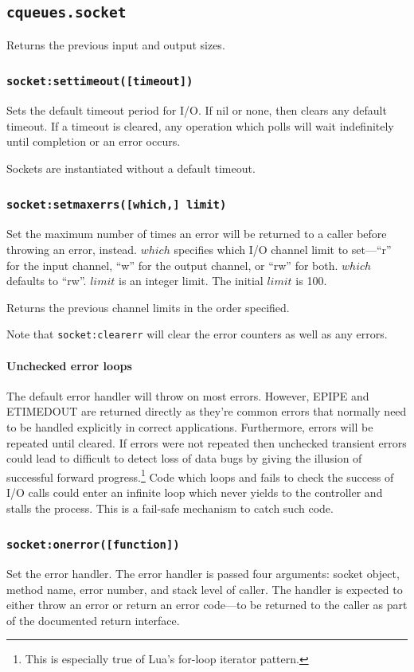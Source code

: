 \documentclass[11pt, oneside]{memoir}
\newcommand*{\fn}[1]{\texttt{#1}\xspace}
\newcounter{toccols}
\newenvironment{Module}[1]{
	\subsection{\texttt{#1}}
	\addtocontents{toc}{
		\protect\begin{multicols}{\value{toccols}}
	}
}{
	\addtocontents{toc}{\protect\end{multicols}}
}
\begin{document}
\begin{Module}{cqueues.socket}
Returns the previous input and output sizes.

\subsubsection[\fn{socket:settimeout}]{\fn{socket:settimeout([timeout])}}

Sets the default timeout period for I/O. If nil or none, then clears any default timeout. If a timeout is cleared, any operation which polls will wait indefinitely until completion or an error occurs.

Sockets are instantiated without a default timeout.

\subsubsection[\fn{socket:setmaxerrs}]{\fn{socket:setmaxerrs([which,] limit)}}

Set the maximum number of times an error will be returned to a caller before throwing an error, instead. $which$ specifies which I/O channel limit to set---``r'' for the input channel, ``w'' for the output channel, or ``rw'' for both. $which$ defaults to ``rw''. $limit$ is an integer limit. The initial $limit$ is 100.

Returns the previous channel limits in the order specified.

Note that \fn{socket:clearerr} will clear the error counters as well as any errors.

\paragraph{Unchecked error loops} The default error handler will throw on most errors. However, EPIPE and ETIMEDOUT are returned directly as they're common errors that normally need to be handled explicitly in correct applications. Furthermore, errors will be repeated until cleared. If errors were not repeated then unchecked transient errors could lead to difficult to detect loss of data bugs by giving the illusion of successful forward progress.\footnote{This is especially true of Lua's for-loop iterator pattern.} Code which loops and fails to check the success of I/O calls could enter an infinite loop which never yields to the controller and stalls the process. This is a fail-safe mechanism to catch such code.

\subsubsection[\fn{socket:onerror}]{\fn{socket:onerror([function])}}
Set the error handler. The error handler is passed four arguments: socket object, method name, error number, and stack level of caller. The handler is expected to either throw an error or return an error code---to be returned to the caller as part of the documented return interface.


\end{Module}
\end{document}
